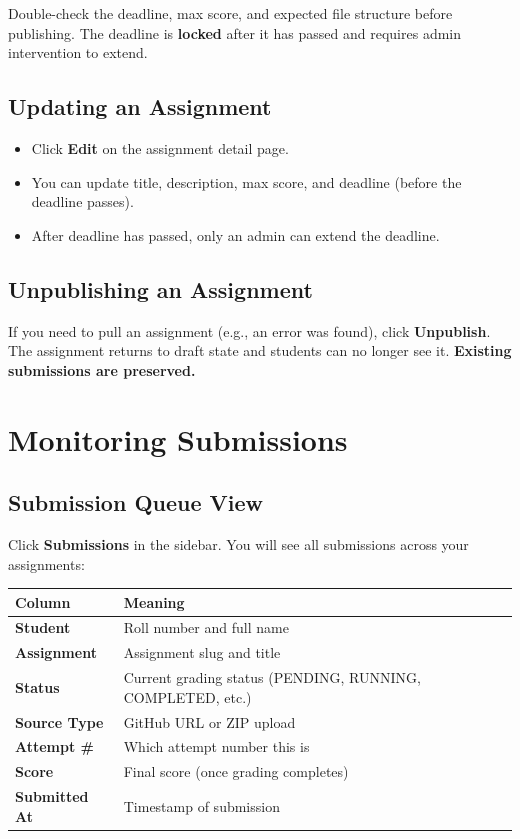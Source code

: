 \documentclass[12pt,a4paper]{article}
\begin{document}
\begin{dangerbox}
  Double-check the deadline, max score, and expected file structure before publishing. The deadline is \textbf{locked} after it has passed and requires admin intervention to extend.
\end{dangerbox}

\subsection{Updating an Assignment}

\begin{itemize}
  \item Click \textbf{Edit} on the assignment detail page.
  \item You can update title, description, max score, and deadline (before the deadline passes).
  \item After deadline has passed, only an admin can extend the deadline.
\end{itemize}

\subsection{Unpublishing an Assignment}

If you need to pull an assignment (e.g., an error was found), click \textbf{Unpublish}. The assignment returns to draft state and students can no longer see it. \textbf{Existing submissions are preserved.}

\section{Monitoring Submissions}

\subsection{Submission Queue View}

Click \textbf{Submissions} in the sidebar. You will see all submissions across your assignments:

\begin{center}
\begin{tabularx}{\linewidth}{>{\bfseries}lX}
\toprule
Column & Meaning \\
\midrule
Student         & Roll number and full name \\
Assignment      & Assignment slug and title \\
Status          & Current grading status (PENDING, RUNNING, COMPLETED, etc.) \\
Source Type     & GitHub URL or ZIP upload \\
Attempt \#      & Which attempt number this is \\
Score           & Final score (once grading completes) \\
Submitted At    & Timestamp of submission \\
\bottomrule
\end{tabularx}
\end{center}
\end{document}
